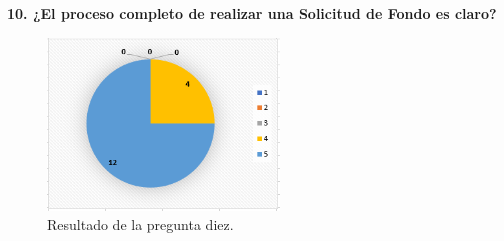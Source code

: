 \textbf{10. ¿El proceso completo de realizar una Solicitud de Fondo es claro?}

\begin{figure}[h]
    \centering
    \includegraphics[width=0.55\textwidth]{Imagenes/Pregunta10.1.png}
    \caption{\label{fig: Pregunta10}Resultado de la pregunta diez.}
\end{figure}


